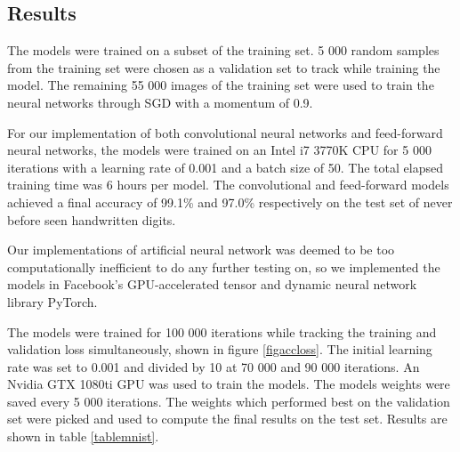 \documentclass[a4paper, twoside]{article}
\begin{document}
\subsection{Results}
The models were trained on a subset of the training set. 5 000 random samples from the training set were chosen as a validation set to track while training the model. The remaining 55 000 images of the training set were used to train the neural networks through SGD with a momentum \cite{cs231n} of 0.9.

For our implementation of both convolutional neural networks and feed-forward neural networks, the models were trained on an Intel i7 3770K CPU for 5 000 iterations with a learning rate of 0.001 and a batch size of 50. The total elapsed training time was 6 hours per model. The convolutional and feed-forward models achieved a final accuracy of 99.1\% and 97.0\% respectively on the test set of never before seen handwritten digits. 

Our implementations of artificial neural network was deemed to be too computationally inefficient to do any further testing on, so we implemented the models in Facebook's GPU-accelerated tensor and dynamic neural network library PyTorch.

The models were trained for 100 000 iterations while tracking the training and validation loss simultaneously, shown in figure \ref{figaccloss}. The initial learning rate was set to 0.001 and divided by 10 at 70 000 and 90 000 iterations. An Nvidia GTX 1080ti GPU was used to train the models. The models weights were saved every 5 000 iterations. The weights which performed best on the validation set were picked and used to compute the final results on the test set. Results are shown in table \ref{tablemnist}.
\end{document}
